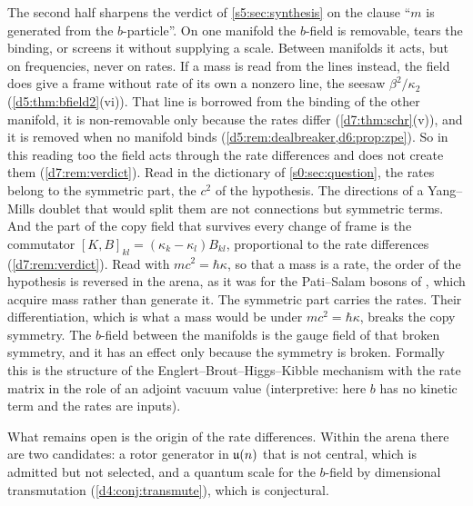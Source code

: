 The second half sharpens the verdict of \cref{s5:sec:synthesis} on the clause ``$m$ is generated from the $b$-particle''. On one manifold the
$b$-field is removable, tears the binding, or screens it without supplying a scale. Between manifolds it acts, but on frequencies, never on rates. If a mass is read from the lines instead, the field does give a frame without rate of its own a nonzero line, the seesaw $\beta^2/\kappa_2$ (\cref{d5:thm:bfield2}(vi)). That line is borrowed from the binding of the other manifold, it is non-removable only because the rates differ (\cref{d7:thm:schr}(v)), and it is removed when no manifold binds (\cref{d5:rem:dealbreaker,d6:prop:zpe}). So in this reading too the field acts through the rate differences and does not create them (\cref{d7:rem:verdict}). Read in the dictionary of
\cref{s0:sec:question}, the rates belong to the symmetric part, the $c^2$ of the hypothesis. The directions of a Yang--Mills doublet that would
split them are not connections but symmetric terms. And the part of the copy field that survives every change of frame is the commutator
$[K,B]_{kl}=(\kappa_k-\kappa_l)B_{kl}$, proportional to the rate differences (\cref{d7:rem:verdict}). Read with $mc^2=\hbar\kappa$, so that a mass is a rate, the order of the hypothesis is
reversed in the arena, as it was for the Pati--Salam bosons of \cite{ES17}, which acquire mass rather than generate it. The symmetric part carries the rates.
Their differentiation, which is what a mass would be under $mc^2=\hbar\kappa$, breaks the copy symmetry. The $b$-field between the manifolds is the
gauge field of that broken symmetry, and it has an effect only because the symmetry is broken. Formally this is the structure of the
Englert--Brout--Higgs--Kibble mechanism with the rate matrix in the role of an adjoint vacuum value (interpretive: here $b$ has no kinetic term
and the rates are inputs).

What remains open is the origin of the rate differences. Within the arena there are two candidates: a rotor generator in $\mathfrak{u}(n)$ that is not
central, which is admitted but not selected, and a quantum scale for the $b$-field by dimensional transmutation (\cref{d4:conj:transmute}),
which is conjectural.

